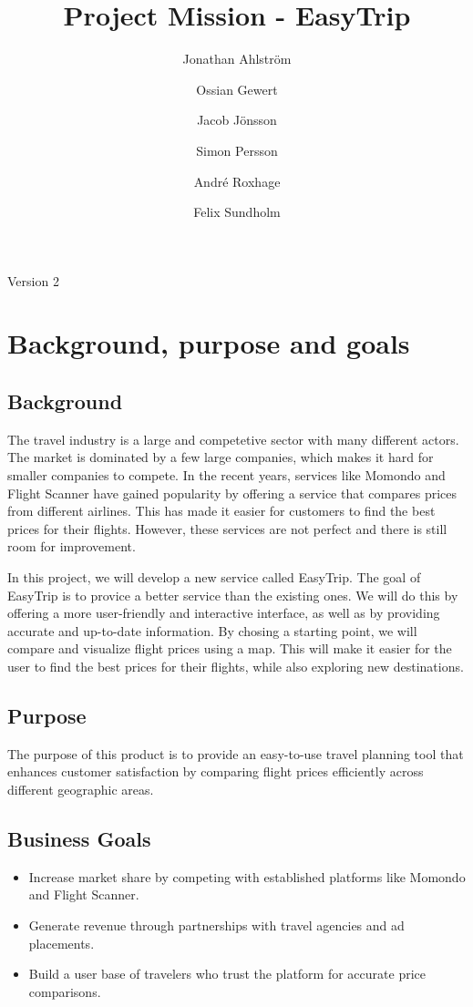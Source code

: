\documentclass[a4paper]{article}
\title{Project Mission - EasyTrip}
\author{Jonathan Ahlström \and Ossian Gewert \and Jacob Jönsson \and Simon Persson \and André Roxhage \and Felix Sundholm}
\begin{document}
\maketitle

\begin{center}
    Version 2

\end{center}

\tableofcontents  %

\section{Background, purpose and goals}
\subsection{Background}
The travel industry is a large and competetive sector with many different actors.
The market is dominated by a few large companies,
which makes it hard for smaller companies to compete.
In the recent years,
services like Momondo and Flight Scanner have gained popularity by offering a service that compares prices from different airlines.
This has made it easier for customers to find the best prices for their flights.
However, these services are not perfect and there is still room for improvement. 

In this project, we will develop a new service called EasyTrip. The goal of EasyTrip is to provice a better service than the existing ones. We will do this by offering a more user-friendly and interactive interface, as well as by providing accurate and up-to-date information. By chosing a starting point, we will compare and visualize flight prices using a map. This will make it easier for the user to find the best prices for their flights, while also exploring new destinations.

\subsection{Purpose}
The purpose of this product is to provide an easy-to-use travel planning tool that enhances customer satisfaction by comparing flight prices efficiently across different geographic areas.

\subsection{Business Goals}
\begin{itemize}
    \item Increase market share by competing with established platforms like Momondo and Flight Scanner.
    \item Generate revenue through partnerships with travel agencies and ad placements.
    \item Build a user base of travelers who trust the platform for accurate price comparisons.
\end{itemize}
\end{document}
